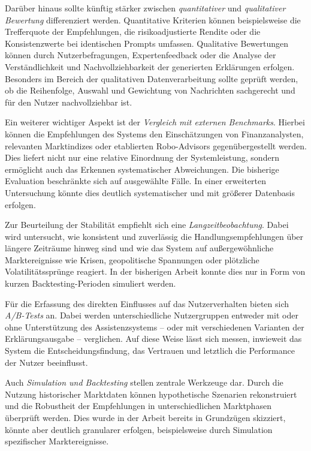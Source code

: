     Darüber hinaus sollte künftig stärker zwischen \emph{quantitativer} und \emph{qualitativer Bewertung} differenziert werden.
    Quantitative Kriterien können beispielsweise die Trefferquote der Empfehlungen, die risikoadjustierte Rendite oder die Konsistenzwerte bei identischen Prompts umfassen.
    Qualitative Bewertungen können durch Nutzerbefragungen, Expertenfeedback oder die Analyse der Verständlichkeit und Nachvollziehbarkeit der generierten Erklärungen erfolgen.
    Besonders im Bereich der qualitativen Datenverarbeitung sollte geprüft werden, ob die Reihenfolge, Auswahl und Gewichtung von Nachrichten sachgerecht und für den Nutzer nachvollziehbar ist.

    Ein weiterer wichtiger Aspekt ist der \emph{Vergleich mit externen Benchmarks}.
    Hierbei können die Empfehlungen des Systems den Einschätzungen von Finanzanalysten, relevanten Marktindizes oder etablierten Robo-Advisors gegenübergestellt werden.
    Dies liefert nicht nur eine relative Einordnung der Systemleistung, sondern ermöglicht auch das Erkennen systematischer Abweichungen.
    Die bisherige Evaluation beschränkte sich auf ausgewählte Fälle.
    In einer erweiterten Untersuchung könnte dies deutlich systematischer und mit größerer Datenbasis erfolgen.

    Zur Beurteilung der Stabilität empfiehlt sich eine \emph{Langzeitbeobachtung}.
    Dabei wird untersucht, wie konsistent und zuverlässig die Handlungsempfehlungen über längere Zeiträume hinweg sind und wie das System auf außergewöhnliche Marktereignisse wie Krisen, geopolitische Spannungen oder plötzliche Volatilitätssprünge reagiert.
    In der bisherigen Arbeit konnte dies nur in Form von kurzen Backtesting-Perioden simuliert werden.

    Für die Erfassung des direkten Einflusses auf das Nutzerverhalten bieten sich \emph{A/B-Tests} an.
    Dabei werden unterschiedliche Nutzergruppen entweder mit oder ohne Unterstützung des Assistenzsystems -- oder mit verschiedenen Varianten der Erklärungsausgabe -- verglichen.
    Auf diese Weise lässt sich messen, inwieweit das System die Entscheidungsfindung, das Vertrauen und letztlich die Performance der Nutzer beeinflusst.

    Auch \emph{Simulation und Backtesting} stellen zentrale Werkzeuge dar.
    Durch die Nutzung historischer Marktdaten können hypothetische Szenarien rekonstruiert und die Robustheit der Empfehlungen in unterschiedlichen Marktphasen überprüft werden.
    Dies wurde in der Arbeit bereits in Grundzügen skizziert, könnte aber deutlich granularer erfolgen, beispielsweise durch Simulation spezifischer Marktereignisse.

